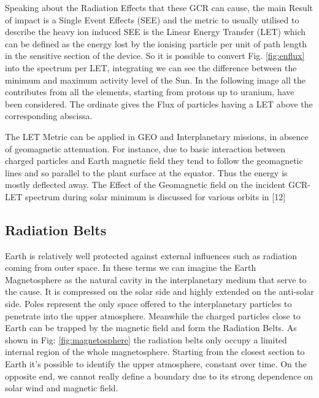 \documentclass[./dissertation.tex]{subfiles}
\begin{document}
Speaking about the Radiation Effects that these GCR can cause, the main Result of impact is a Single Event Effects (SEE) and the metric to usually utilised to describe the heavy ion induced SEE is the Linear Energy Transfer (LET) which can be defined as the energy lost by the ionising particle per unit of path length in the sensitive section of the device. So it is possible to convert Fig. \ref{fig:enflux} into the spectrum per LET, integrating we can see the difference between the minimum and maximum activity level of the Sun. In the following image all the contributes from all the elements, starting from protons up to uranium, have been considered. The ordinate gives the Flux of particles having a LET above the corresponding abscissa. 

The LET Metric can be applied in GEO and Interplanetary missions, in absence of geomagnetic attenuation. For instance, due to basic interaction between charged particles and Earth magnetic field they tend to follow the geomagnetic lines and so parallel to the plant surface at the equator. Thus the energy is mostly deflected away. The Effect of the Geomagnetic field on the incident GCR-LET spectrum during solar minimum is discussed for various orbits in [12]


\subsection{Radiation Belts}
Earth is relatively well protected against external influences such as radiation coming from outer space. In these terms we can imagine the Earth Magnetosphere as the natural cavity in the interplanetary medium that serve to the cause. It is compressed on the solar side and highly extended on the anti-solar side. Poles represent the only space offered to the interplanetary particles to penetrate into the upper atmosphere. Meanwhile the charged particles close to Earth can be trapped by the magnetic field and form the Radiation Belts. As shown in Fig: \ref{fig:magnetosphere} the radiation belts only occupy a limited internal region of the whole magnetosphere. Starting from the closest section to Earth it's possible to identify the upper atmosphere, constant over time. On the opposite end, we cannot really define a boundary due to its strong dependence on solar wind and magnetic field.
\end{document}
